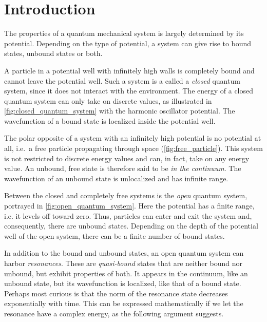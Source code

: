 \documentclass[../main/report.tex]{subfiles}
\begin{document}
\chapter{Introduction}

The properties of a quantum mechanical system is largely determined by its potential. 
Depending on the type of potential, a system can give rise to bound states, unbound states or both.

A particle in a potential well with infinitely high walls is completely bound and cannot leave the potential well.
Such a system is a called a \emph{closed} quantum system, since it does not interact with the environment. 
The energy of a closed quantum system can only take on discrete values, as illustrated in \cref{fig:closed_quantum_system} with the harmonic oscillator potential.
The wavefunction of a bound state is localized inside the potential well.


The polar opposite of a system with an infinitely high potential is no potential at all, i.e.~a free particle propagating through space (\cref{fig:free_particle}).
This system is not restricted to discrete energy values and can, in fact, take on any energy value.
An unbound, free state is therefore said to be \emph{in the continuum}.
The wavefunction of an unbound state is unlocalized and has infinite range.

Between the closed and completely free systems is the \emph{open} quantum system, portrayed in \cref{fig:open_quantum_system}. 
Here\todo{,} the potential has a finite range, i.e. it levels off toward zero.
Thus, particles can enter and exit the system and, consequently, there are unbound states. 
Depending on the depth of the potential well of the open system, there can be a finite number of bound states.

In addition to the bound and unbound states, an open quantum system can harbor \emph{resonances}. 
These are \emph{quasi-bound} states that are neither bound nor unbound, but exhibit properties of both. 
It appears in the continuum, like an unbound state, but its wavefunction is localized, like that of a bound state.
Perhaps most curious is that the norm of the resonance state decreases exponentially with time. 
This can be expressed mathematically if we let the resonance have a complex energy, as the following argument suggests.
\end{document}
